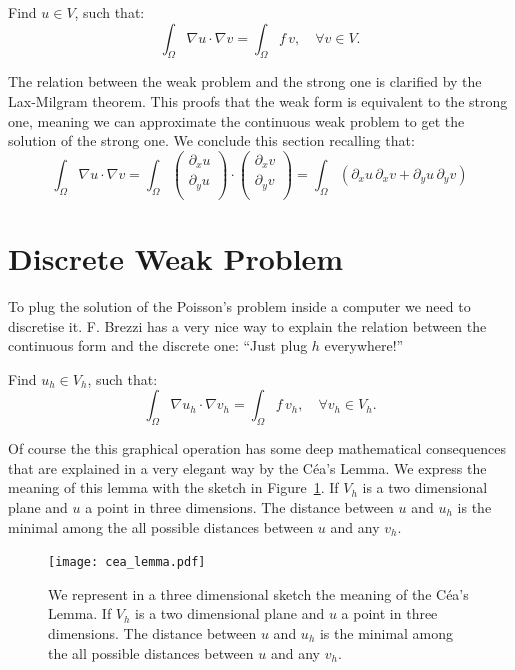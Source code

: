 \documentclass[11pt]{amsart}
\begin{document}
Find $u\in V$, such that:
\[
\int_\Omega \nabla u \cdot \nabla v = \int_\Omega f\, v, \quad \forall v \in V.
\]

The relation between the weak problem and the strong one 
is clarified by the Lax-Milgram theorem. This proofs 
that the weak form is equivalent to the strong one, meaning 
we can approximate the continuous weak problem to get the solution 
of the strong one. We conclude this section recalling that:
\[
\int_\Omega \nabla u \cdot \nabla v = \int_\Omega 
\left(
\begin{array}{c}
\partial_x u\\
\partial_y u\\
\end{array}
\right) \cdot
\left(
\begin{array}{c}
\partial_x v\\
\partial_y v\\
\end{array}
\right) = 
\int_\Omega \left(
\partial_x u\, \partial_x v + 
\partial_y u\, \partial_y v\right)
\]

\section{Discrete Weak Problem}

To plug the solution of the Poisson's problem inside a computer 
we need to discretise it. F. Brezzi has a very nice way to explain 
the relation between the continuous form and the discrete one:
``Just plug $h$ everywhere!''

Find $u_h\in V_h$, such that:
\[
\int_\Omega \nabla u_h \cdot \nabla v_h = \int_\Omega f\, v_h, \quad \forall v_h \in V_h.
\]

Of course the this graphical operation has some deep mathematical consequences
that are explained in a very elegant way by the C\'ea's Lemma. We express the 
meaning of this lemma with the sketch in Figure~\ref{fig:cea_lemma}. If $V_h$ is a two dimensional plane and $u$ a point in three dimensions. The distance between $u$ and $u_h$ is the minimal among the all possible distances 
between $u$ and any $v_h$.
\begin{figure}[h]
\centering
\texttt{[image: cea\_lemma.pdf]}
\caption{We represent in a three dimensional sketch the meaning of the C\'ea's Lemma.
If $V_h$ is a two dimensional plane and $u$ a point in three dimensions. The distance between $u$ and $u_h$ is the minimal among the all possible distances 
between $u$ and any $v_h$.}
\label{fig:cea_lemma}
\end{figure}
\end{document}

